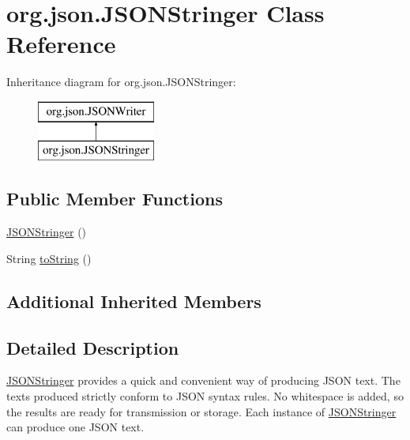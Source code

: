 \hypertarget{classorg_1_1json_1_1JSONStringer}{\section{org.\-json.\-J\-S\-O\-N\-Stringer Class Reference}
\label{classorg_1_1json_1_1JSONStringer}
}
Inheritance diagram for org.\-json.\-J\-S\-O\-N\-Stringer\-:\begin{figure}[H]
\begin{center}
\leavevmode
\includegraphics[height=2.000000cm]{classorg_1_1json_1_1JSONStringer}
\end{center}
\end{figure}
\subsection*{Public Member Functions}
\begin{DoxyCompactItemize}
\item 
\hyperlink{classorg_1_1json_1_1JSONStringer_a36d3accdcf3f40434edd9c33b414d3f9}{J\-S\-O\-N\-Stringer} ()
\item 
String \hyperlink{classorg_1_1json_1_1JSONStringer_a2e7f28e99eb46f767b5df8a669e774b4}{to\-String} ()
\end{DoxyCompactItemize}
\subsection*{Additional Inherited Members}


\subsection{Detailed Description}
\hyperlink{classorg_1_1json_1_1JSONStringer}{J\-S\-O\-N\-Stringer} provides a quick and convenient way of producing J\-S\-O\-N text. The texts produced strictly conform to J\-S\-O\-N syntax rules. No whitespace is added, so the results are ready for transmission or storage. Each instance of \hyperlink{classorg_1_1json_1_1JSONStringer}{J\-S\-O\-N\-Stringer} can produce one J\-S\-O\-N text. 


